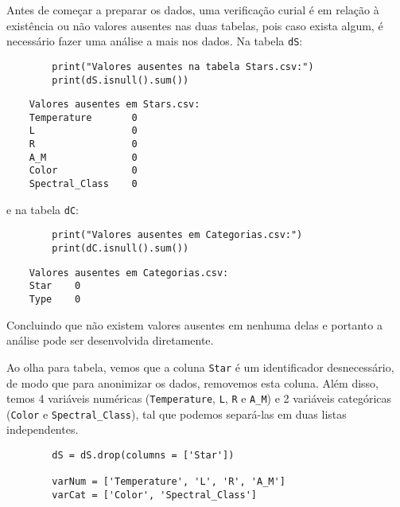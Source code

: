 Antes de começar a preparar os dados, uma verificação curial é em relação à existência ou não valores ausentes nas duas tabelas, pois caso exista algum, é necessário fazer uma análise a mais nos dados. Na tabela \verb|dS|:
\begin{longlisting}
    \begin{verbatim}
        print("Valores ausentes na tabela Stars.csv:")
        print(dS.isnull().sum())
    \end{verbatim}
\end{longlisting}
\begin{verbatim}
    Valores ausentes em Stars.csv:
    Temperature       0
    L                 0
    R                 0
    A_M               0
    Color             0
    Spectral_Class    0
\end{verbatim}
e na tabela \verb|dC|:
\begin{longlisting}
    \begin{verbatim}
        print("Valores ausentes em Categorias.csv:")
        print(dC.isnull().sum())
    \end{verbatim}
\end{longlisting}
\begin{verbatim}
    Valores ausentes em Categorias.csv:
    Star    0
    Type    0
\end{verbatim}

Concluindo que não existem valores ausentes em nenhuma delas e portanto a análise pode ser desenvolvida diretamente.

Ao olha para tabela, vemos que a coluna \verb|Star| é um identificador desnecessário, de modo que para anonimizar os dados, removemos esta coluna. Além disso, temos 4 variáveis numéricas (\verb|Temperature|, \verb|L|, \verb|R| e \verb|A_M|) e 2 variáveis categóricas (\verb|Color| e \verb|Spectral_Class|), tal que podemos separá-las em duas listas independentes.
\begin{longlisting}
    \begin{verbatim}
        dS = dS.drop(columns = ['Star'])

        varNum = ['Temperature', 'L', 'R', 'A_M'] 
        varCat = ['Color', 'Spectral_Class'] 
    \end{verbatim}
\end{longlisting}


